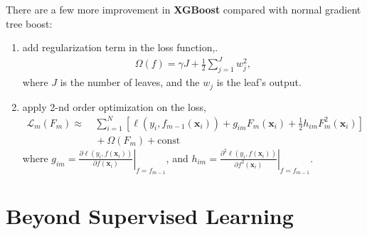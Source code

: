 
There are a few more improvement in \textbf{XGBoost} compared with normal gradient tree boost:
\begin{enumerate}[(1)]
    \item add regularization term in the loss function,.
    \begin{gather}
        \Omega(f)=\gamma J + \frac{1}{2}\sum_{j=1}^Jw_j^2,
    \end{gather}
    where $J$ is the number of leaves, and the $w_j$ is the leaf's output.
    
    \item apply 2-nd order optimization on the loss,
    {\begin{align}
        \mathcal{L}_m(F_m)
        \approx&~ \sum_{i=1}^N\left[
            \ell(y_i,f_{m-1}(\bm{x}_i)) + g_{im}F_m(\bm{x}_i) + \frac{1}{2}h_{im}F_m^2(\bm{x}_i)
        \right] \\
        &~+ \Omega(F_m) + \text{const}
    \end{align}}
    where 
    $g_{im} = \left.
    \frac{\partial \ell(y_i,f(\bm{x}_i))}{\partial f(\bm{x}_i)}
    \right|_{f=f_{m-1}}$, and 
    $h_{im} = \left.
    \frac{\partial^2 \ell(y_i,f(\bm{x}_i))}{\partial f^2(\bm{x}_i)}
    \right|_{f=f_{m-1}}$.
\end{enumerate}

\section{Beyond Supervised Learning}


